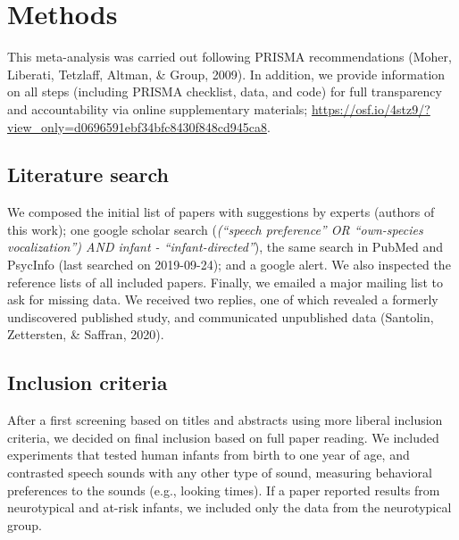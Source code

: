 \documentclass[
  english,
  man]{apa6}
\begin{document}
\hypertarget{methods}{%
\section{Methods}\label{methods}}

This meta-analysis was carried out following PRISMA recommendations (Moher, Liberati, Tetzlaff, Altman, \& Group, 2009). In addition, we provide information on all steps (including PRISMA checklist, data, and code) for full transparency and accountability via online supplementary materials; \url{https://osf.io/4stz9/?view_only=d0696591ebf34bfc8430f848cd945ca8}.

\hypertarget{literature-search}{%
\subsection{Literature search}\label{literature-search}}

We composed the initial list of papers with suggestions by experts (authors of this work); one google scholar search (\emph{(``speech preference'' OR ``own-species vocalization'') AND infant - ``infant-directed''}), the same search in PubMed and PsycInfo (last searched on 2019-09-24); and a google alert. We also inspected the reference lists of all included papers. Finally, we emailed a major mailing list to ask for missing data. We received two replies, one of which revealed a formerly undiscovered published study, and communicated unpublished data (Santolin, Zettersten, \& Saffran, 2020).

\hypertarget{inclusion-criteria}{%
\subsection{Inclusion criteria}\label{inclusion-criteria}}

After a first screening based on titles and abstracts using more liberal inclusion criteria, we decided on final inclusion based on full paper reading. We included experiments that tested human infants from birth to one year of age, and contrasted speech sounds with any other type of sound, measuring behavioral preferences to the sounds (e.g., looking times). If a paper reported results from neurotypical and at-risk infants, we included only the data from the neurotypical group.
\end{document}
